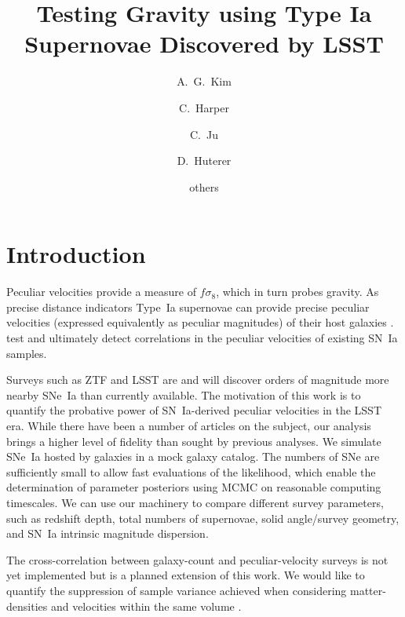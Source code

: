\documentclass{aastex62}   	%
\begin{document}
\title{Testing Gravity using Type Ia Supernovae Discovered by LSST}
\author[0000-0001-6315-8743]{A.~G.~Kim}
\author{C.~Harper}
\author{C.~Ju}
\author{D.~Huterer}

\author{others}



\section{Introduction}
Peculiar velocities provide a measure of $f\sigma_8$, which in turn probes gravity.  As precise distance indicators Type~Ia supernovae
can provide precise peculiar velocities (expressed equivalently as peculiar magnitudes)
of their host galaxies \citep{2006PhRvD..73l3526H,2011ApJ...741...67D}.
\citet{2015JCAP...12..033H, 2017JCAP...05..015H}  test and ultimately detect correlations in the peculiar velocities of existing SN~Ia samples.

Surveys such as ZTF and LSST are and will discover orders of magnitude more nearby SNe~Ia than currently available.
The motivation of this work is to quantify the probative power of SN~Ia-derived peculiar velocities in the LSST era.
While there have been a number of articles on the subject,
our analysis brings a higher level of fidelity than sought by previous analyses.  We simulate SNe~Ia hosted by galaxies in a mock galaxy
catalog. The numbers of SNe are sufficiently small to allow fast evaluations of the likelihood, which enable the determination of parameter
posteriors using MCMC on reasonable computing timescales.   We can use our machinery to 
compare different survey parameters, such as redshift depth, total numbers of supernovae,
solid angle/survey geometry, and SN~Ia intrinsic magnitude dispersion.

The cross-correlation between galaxy-count and peculiar-velocity surveys is not yet implemented but is a planned extension of this work.  We would like to
quantify the suppression of sample variance achieved when considering matter-densities and velocities 
within the same volume \citep{2007PhRvL..99h1301G}.
\end{document}
